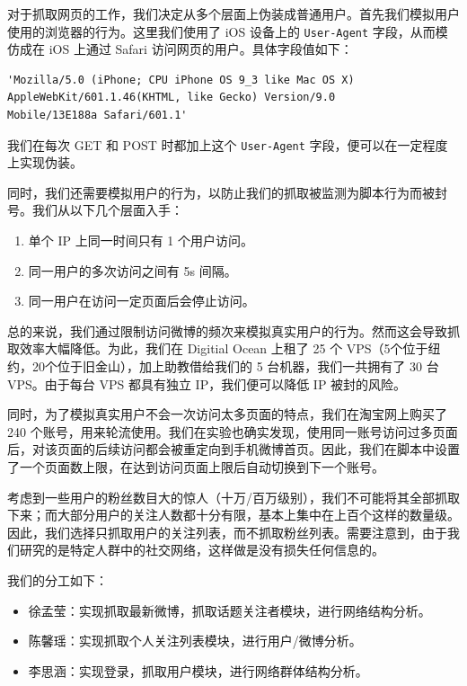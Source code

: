 \documentclass[a4paper,UTF8]{ctexart}
\providecommand{\tightlist}{%
  \setlength{\itemsep}{0pt}\setlength{\parskip}{0pt}}
\begin{document}
对于抓取网页的工作，我们决定从多个层面上伪装成普通用户。首先我们模拟用户使用的浏览器的行为。这里我们使用了
iOS 设备上的 \texttt{User-Agent} 字段，从而模仿成在 iOS 上通过 Safari
访问网页的用户。具体字段值如下：

\begin{verbatim}
'Mozilla/5.0 (iPhone; CPU iPhone OS 9_3 like Mac OS X)
AppleWebKit/601.1.46(KHTML, like Gecko) Version/9.0
Mobile/13E188a Safari/601.1'
\end{verbatim}

我们在每次 GET 和 POST 时都加上这个 \texttt{User-Agent}
字段，便可以在一定程度上实现伪装。

同时，我们还需要模拟用户的行为，以防止我们的抓取被监测为脚本行为而被封号。我们从以下几个层面入手：

\begin{enumerate}
\def\labelenumi{\arabic{enumi}.}
\tightlist
\item
  单个 IP 上同一时间只有 1 个用户访问。
\item
  同一用户的多次访问之间有 5s 间隔。
\item
  同一用户在访问一定页面后会停止访问。
\end{enumerate}

总的来说，我们通过限制访问微博的频次来模拟真实用户的行为。然而这会导致抓取效率大幅降低。为此，我们在
Digitial Ocean 上租了 25 个
VPS（5个位于纽约，20个位于旧金山），加上助教借给我们的 5
台机器，我们一共拥有了 30 台 VPS。由于每台 VPS 都具有独立
IP，我们便可以降低 IP 被封的风险。

同时，为了模拟真实用户不会一次访问太多页面的特点，我们在淘宝网上购买了
240
个账号，用来轮流使用。我们在实验也确实发现，使用同一账号访问过多页面后，对该页面的后续访问都会被重定向到手机微博首页。因此，我们在脚本中设置了一个页面数上限，在达到访问页面上限后自动切换到下一个账号。

考虑到一些用户的粉丝数目大的惊人（十万/百万级别），我们不可能将其全部抓取下来；而大部分用户的关注人数都十分有限，基本上集中在上百个这样的数量级。因此，我们选择只抓取用户的关注列表，而不抓取粉丝列表。需要注意到，由于我们研究的是特定人群中的社交网络，这样做是没有损失任何信息的。

我们的分工如下：

\begin{itemize}
\tightlist
\item
  徐孟莹：实现抓取最新微博，抓取话题关注者模块，进行网络结构分析。
\item
  陈馨瑶：实现抓取个人关注列表模块，进行用户/微博分析。
\item
  李思涵：实现登录，抓取用户模块，进行网络群体结构分析。
\end{itemize}
\end{document}
